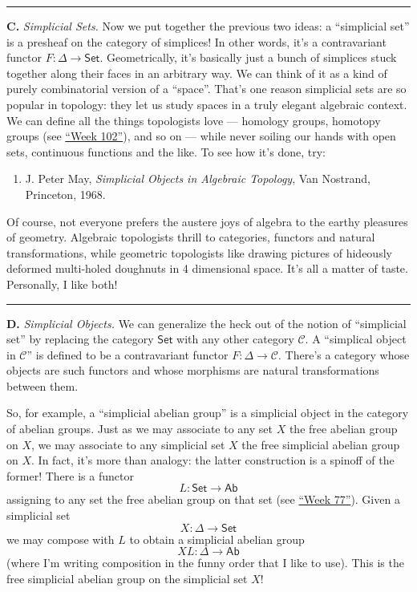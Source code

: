 \documentclass{article}
\def\tightlist{}
\begin{document}
\begin{center}\rule{0.5\linewidth}{0.5pt}\end{center}

\textbf{C.} \emph{Simplicial Sets.} Now we put together the previous two
ideas: a ``simplicial set'' is a presheaf on the category of simplices!
In other words, it's a contravariant functor
\(F\colon\Delta\to\mathsf{Set}\). Geometrically, it's basically just a
bunch of simplices stuck together along their faces in an arbitrary way.
We can think of it as a kind of purely combinatorial version of a
``space''. That's one reason simplicial sets are so popular in topology:
they let us study spaces in a truly elegant algebraic context. We can
define all the things topologists love --- homology groups, homotopy
groups (see \protect\hyperlink{week102}{``Week 102''}), and so on ---
while never soiling our hands with open sets, continuous functions and
the like. To see how it's done, try:

\begin{enumerate}
\def\labelenumi{\arabic{enumi})}
\setcounter{enumi}{3}
\tightlist
\item
  J. Peter May, \emph{Simplicial Objects in Algebraic Topology}, Van
  Nostrand, Princeton, 1968.
\end{enumerate}

Of course, not everyone prefers the austere joys of algebra to the
earthy pleasures of geometry. Algebraic topologists thrill to
categories, functors and natural transformations, while geometric
topologists like drawing pictures of hideously deformed multi-holed
doughnuts in 4 dimensional space. It's all a matter of taste.
Personally, I like both!

\begin{center}\rule{0.5\linewidth}{0.5pt}\end{center}

\textbf{D.} \emph{Simplicial Objects.} We can generalize the heck out of
the notion of ``simplicial set'' by replacing the category
\(\mathsf{Set}\) with any other category \(\mathcal{C}\). A ``simplical
object in \(\mathcal{C}\)'' is defined to be a contravariant functor
\(F\colon\Delta\to\mathcal{C}\). There's a category whose objects are
such functors and whose morphisms are natural transformations between
them.

So, for example, a ``simplicial abelian group'' is a simplicial object
in the category of abelian groups. Just as we may associate to any set
\(X\) the free abelian group on \(X\), we may associate to any
simplicial set \(X\) the free simplicial abelian group on \(X\). In
fact, it's more than analogy: the latter construction is a spinoff of
the former! There is a functor \[L\colon\mathsf{Set}\to\mathsf{Ab}\]
assigning to any set the free abelian group on that set (see
\protect\hyperlink{week77}{``Week 77''}). Given a simplicial set
\[X\colon\Delta\to\mathsf{Set}\] we may compose with \(L\) to obtain a
simplicial abelian group \[XL\colon\Delta\to\mathsf{Ab}\] (where I'm
writing composition in the funny order that I like to use). This is the
free simplicial abelian group on the simplicial set \(X\)!
\end{document}
